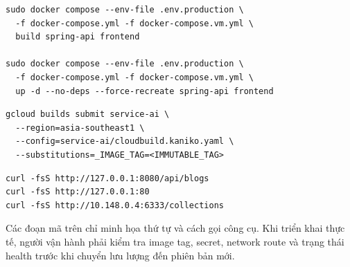 \begin{lstlisting}[style=terminal,caption={Build và cập nhật các dịch vụ trên GCE VM},label={lst:appendix-gce-deploy}]
sudo docker compose --env-file .env.production \
  -f docker-compose.yml -f docker-compose.vm.yml \
  build spring-api frontend

sudo docker compose --env-file .env.production \
  -f docker-compose.yml -f docker-compose.vm.yml \
  up -d --no-deps --force-recreate spring-api frontend
\end{lstlisting}

\begin{lstlisting}[style=terminal,caption={Build image AI Service bằng Cloud Build},label={lst:appendix-cloud-build}]
gcloud builds submit service-ai \
  --region=asia-southeast1 \
  --config=service-ai/cloudbuild.kaniko.yaml \
  --substitutions=_IMAGE_TAG=<IMMUTABLE_TAG>
\end{lstlisting}

\begin{lstlisting}[style=terminal,caption={Kiểm tra nhanh dịch vụ sau triển khai},label={lst:appendix-deployment-check}]
curl -fsS http://127.0.0.1:8080/api/blogs
curl -fsS http://127.0.0.1:80
curl -fsS http://10.148.0.4:6333/collections
\end{lstlisting}

Các đoạn mã trên chỉ minh họa thứ tự và cách gọi công cụ. Khi triển khai thực tế,
người vận hành phải kiểm tra image tag, secret, network route và trạng thái health
trước khi chuyển lưu lượng đến phiên bản mới.
